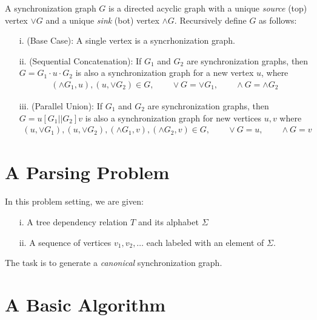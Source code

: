 \documentclass[12pt]{article}
\begin{document}
\begin{definition}
  A synchronization graph \(G\) is a directed acyclic graph
  with a unique \textit{source} (top) vertex \(\vee G\)
  and a unique \textit{sink} (bot) vertex \(\wedge G\).
  Recursively define \(G\) as follows:
  \begin{enumerate}
    \item[i.] (Base Case):
      A single vertex is a syncrhonization graph.

    \item[ii.] (Sequential Concatenation):
      If \(G_1\) and \(G_2\) are synchronization graphs,
      then \(G = G_1 \cdot u \cdot G_2\) is also a synchronization graph
      for a new vertex \(u\), where
      \begin{align*}
        (\wedge G_1, u), (u, \vee G_2) \in G,
        \qquad \vee G = \vee G_1,
        \qquad \wedge G = \wedge G_2
      \end{align*}


    \item[iii.] (Parallel Union):
      If \(G_1\) and \(G_2\) are synchronization graphs,
      then \(G = u [ G_1 || G_2 ] v\) is also a synchronization graph
      for new vertices \(u, v\) where
      \begin{align*}
        (u, \vee G_1), (u, \vee G_2),
        (\wedge G_1, v), (\wedge G_2, v) \in G,
          \qquad \vee G = u,
          \qquad \wedge G = v
      \end{align*}

  \end{enumerate}
\end{definition}

\section{A Parsing Problem}
In this problem setting, we are given:
\begin{enumerate}
  \item[i.] A tree dependency relation \(T\) and its alphabet \(\Sigma\)

  \item[ii.] A sequence of vertices \(v_1, v_2, \ldots\)
    each labeled with an element of \(\Sigma\).

\end{enumerate}

The task is to generate a \textit{canonical} synchronization graph.


\section{A Basic Algorithm}


\printbibliography
\end{document}
